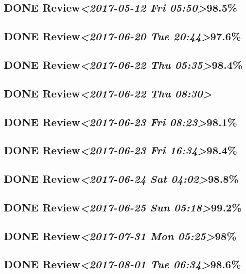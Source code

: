 \documentclass[11pt]{ctexart}
\begin{document}
\subsection{{\bfseries\sffamily DONE} Review\textit{<2017-05-12 Fri 05:50>}98.5\%}
\label{sec:org354dc4b}
\subsection{{\bfseries\sffamily DONE} Review\textit{<2017-06-20 Tue 20:44>}97.6\%}
\label{sec:org130de10}
\subsection{{\bfseries\sffamily DONE} Review\textit{<2017-06-22 Thu 05:35>}98.4\%}
\label{sec:org386615f}
\subsection{{\bfseries\sffamily DONE} Review\textit{<2017-06-22 Thu 08:30>}}
\label{sec:org54afe18}
\subsection{{\bfseries\sffamily DONE} Review\textit{<2017-06-23 Fri 08:23>}98.1\%}
\label{sec:orgbc75218}
\subsection{{\bfseries\sffamily DONE} Review\textit{<2017-06-23 Fri 16:34>}98.4\%}
\label{sec:orgf050b3b}
\subsection{{\bfseries\sffamily DONE} Review\textit{<2017-06-24 Sat 04:02>}98.8\%}
\label{sec:orgaa30c6d}
\subsection{{\bfseries\sffamily DONE} Review\textit{<2017-06-25 Sun 05:18>}99.2\%}
\label{sec:orgfca9a08}
\subsection{{\bfseries\sffamily DONE} Review\textit{<2017-07-31 Mon 05:25>}98\%}
\label{sec:org59e070d}
\subsection{{\bfseries\sffamily DONE} Review\textit{<2017-08-01 Tue 06:34>}98.6\%}
\label{sec:org9cd1125}
\end{document}

